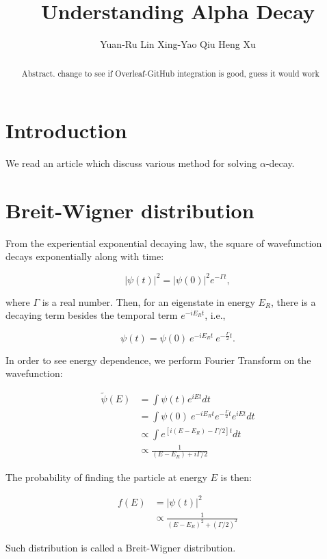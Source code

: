 \documentclass{article}
\title{Understanding Alpha Decay}
\author{
  Yuan-Ru Lin
   \And
  Xing-Yao Qiu
   \And
  Heng Xu
}
\begin{document}
\maketitle

\begin{abstract}
Abstract. change to see if Overleaf-GitHub integration is good, guess it would work
\end{abstract}

\section{Introduction}
We read an article which discuss various method for solving $\alpha$-decay. \cite{understandingalphadecay}

\section{Breit-Wigner distribution}
From the experiential exponential decaying law, the square of wavefunction decays exponentially along with time:

$$|\psi(t)|^2 = |\psi(0)|^2 e^{-\Gamma t},$$

where $\Gamma$ is a real number.
Then, for an eigenstate in energy $E_R$, there is a decaying term besides the temporal term $e^{-iE_Rt}$, i.e.,

$$\psi(t) = \psi(0) \ e^{-iE_Rt} \ e^{-\frac{\Gamma}{2} t}.$$ 

In order to see energy dependence, we perform Fourier Transform on the wavefunction:

\begin{align*}
    \tilde{\psi}(E)
    &= \int \psi(t) e^{iEt} dt \\
    &= \int \psi(0) \ e^{-iE_Rt} e^{-\frac{\Gamma}{2} t} e^{iEt} dt\\
    &\propto \int e^{[i(E-E_R)-\Gamma/2]t} dt \\
    &\propto \frac{1}{(E-E_R)+i\Gamma/2}
\end{align*}

The probability of finding the particle at energy $E$ is then:

\begin{align*}
    f(E) &= |\psi(t)|^2 \\
    &\propto \frac{1}{(E-E_R)^2+(\Gamma/2)^2}
\end{align*}

Such distribution is called a Breit-Wigner distribution.
\end{document}
